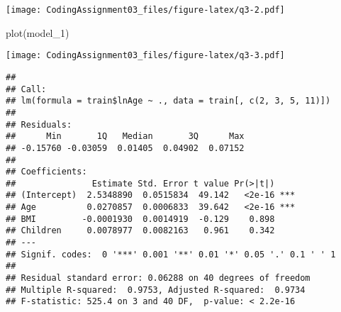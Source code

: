\documentclass[
]{article}
\newenvironment{Shaded}{\begin{snugshade}}{\end{snugshade}}
\newcommand{\AttributeTok}[1]{\textcolor[rgb]{0.77,0.63,0.00}{#1}}
\newcommand{\DecValTok}[1]{\textcolor[rgb]{0.00,0.00,0.81}{#1}}
\newcommand{\FunctionTok}[1]{\textcolor[rgb]{0.00,0.00,0.00}{#1}}
\newcommand{\NormalTok}[1]{#1}
\newcommand{\OtherTok}[1]{\textcolor[rgb]{0.56,0.35,0.01}{#1}}
\newcommand{\SpecialCharTok}[1]{\textcolor[rgb]{0.00,0.00,0.00}{#1}}
\newcommand{\StringTok}[1]{\textcolor[rgb]{0.31,0.60,0.02}{#1}}
\begin{document}
\texttt{[image: CodingAssignment03\_files/figure-latex/q3-2.pdf]}

\begin{Shaded}
\begin{Highlighting}[]
\FunctionTok{plot}\NormalTok{(model\_1)}
\end{Highlighting}
\end{Shaded}

\texttt{[image: CodingAssignment03\_files/figure-latex/q3-3.pdf]}

\begin{Shaded}
\end{Shaded}

\begin{verbatim}
## 
## Call:
## lm(formula = train$lnAge ~ ., data = train[, c(2, 3, 5, 11)])
## 
## Residuals:
##      Min       1Q   Median       3Q      Max 
## -0.15760 -0.03059  0.01405  0.04902  0.07152 
## 
## Coefficients:
##               Estimate Std. Error t value Pr(>|t|)    
## (Intercept)  2.5348890  0.0515834  49.142   <2e-16 ***
## Age          0.0270857  0.0006833  39.642   <2e-16 ***
## BMI         -0.0001930  0.0014919  -0.129    0.898    
## Children     0.0078977  0.0082163   0.961    0.342    
## ---
## Signif. codes:  0 '***' 0.001 '**' 0.01 '*' 0.05 '.' 0.1 ' ' 1
## 
## Residual standard error: 0.06288 on 40 degrees of freedom
## Multiple R-squared:  0.9753, Adjusted R-squared:  0.9734 
## F-statistic: 525.4 on 3 and 40 DF,  p-value: < 2.2e-16
\end{verbatim}

\begin{Shaded}
\end{Shaded}
\end{document}
